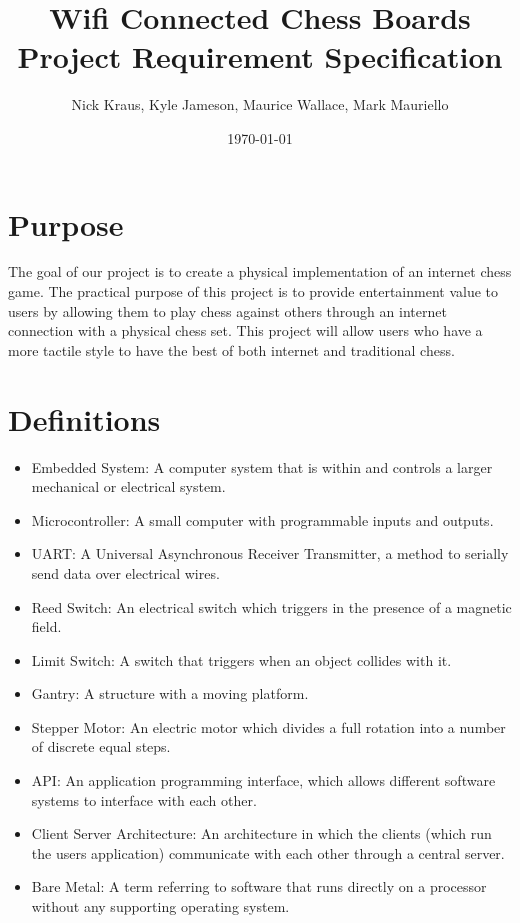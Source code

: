 \documentclass{article}
\title{Wifi Connected Chess Boards \\ \large Project Requirement Specification}
\author{Nick Kraus, Kyle Jameson, Maurice Wallace, Mark Mauriello}
\date{\today}
\begin{document}
\maketitle


\section*{Purpose}
\indent

The goal of our project is to create a physical implementation of an internet chess game. The practical purpose of this project is to provide entertainment value to users by allowing them to play chess against others through an internet connection with a physical chess set. This project will allow users who have a more tactile style to have the best of both internet and traditional chess.

\section*{Definitions}
\indent

\begin{itemize}

	\item Embedded System: A computer system that is within and controls a larger mechanical or electrical system.
	\item Microcontroller: A small computer with programmable inputs and outputs.
	\item UART: A Universal Asynchronous Receiver Transmitter, a method to serially send data over electrical wires.
	\item Reed Switch: An electrical switch which triggers in the presence of a magnetic field.
	\item Limit Switch: A switch that triggers when an object collides with it.
	\item Gantry: A structure with a moving platform.
	\item Stepper Motor: An electric motor which divides a full rotation into a number of discrete equal steps.
	\item API: An application programming interface, which allows different software systems to interface with each other.
	\item Client Server Architecture: An architecture in which the clients (which run the users application) communicate with each other through a central server.
	\item Bare Metal: A term referring to software that runs directly on a processor without any supporting operating system.

\end{itemize}
\end{document}

